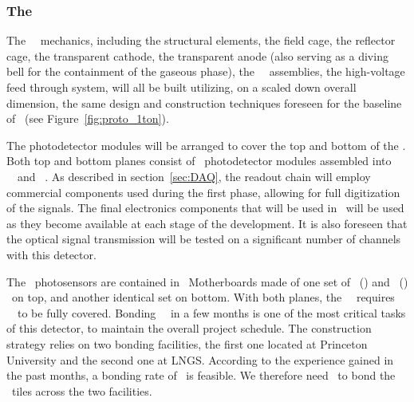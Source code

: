 \subsubsection{The \DSps\ \TPC}

The \DSps\ \TPC\ mechanics, including the structural elements, the field cage, the reflector cage, the transparent cathode, the transparent anode (also serving as a diving bell for the containment of the gaseous phase), the \SiPM\ \DSkPdm\ assemblies, the high-voltage feed through system, will all be built utilizing, on a scaled down overall dimension, the same design and construction techniques foreseen for the baseline of \DSks\ (see Figure~\ref{fig:proto_1ton}). 

The photodetector modules will be arranged to cover the top and bottom of the \TPC. Both top and bottom planes consist of \DSpPdmsHalfNumber\ photodetector modules assembled into \DSpSQBsNumber\ \SQBs\ and \DSpTRBsNumber\ \TRBs. As described in section~\ref{sec:DAQ}, the readout chain will employ commercial components used during the first phase, allowing for full digitization of the signals.  The final electronics components that will be used in \DSks\ will be used as they become available at each stage of the development. It is also foreseen that the optical signal transmission will be tested on a significant number of channels with this detector.

The \DSps\ photosensors are contained in \DSpMBNumber\ Motherboards made of one set of \DSpSQBsNumber\  (\SQB) and \DSpTRBsNumber\  (\TRB) \DSkPdms\ on top, and another identical set on bottom.  With both planes, the \DSps\ \TPC\ requires \DSpPdmsNumber\ \DSkPdm\ to be fully covered. Bonding \DSpSipmsNumber\ \SiPMs\ in a few months is one of the most critical tasks of this detector, to maintain the overall project schedule. %
The construction strategy relies on two bonding facilities, the first one located at Princeton University and the second one at LNGS. According to the experience gained in the past months, a bonding rate of \DSpSipmsBondingRate\ is feasible.  We therefore need \DSpSipmsBondingTime\ to bond the \DSpPdmsNumber\ tiles across the two facilities.

